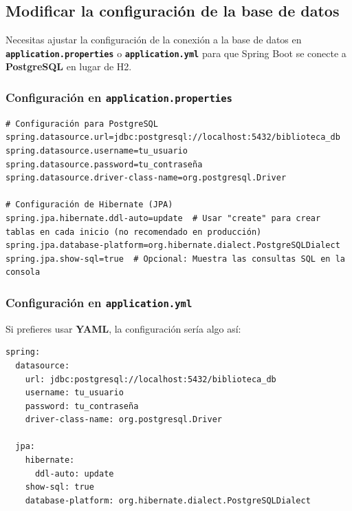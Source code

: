 \documentclass[11pt]{article}
\begin{document}
\subsection{Modificar la configuración de la base de datos}
\label{sec:org623ecda}

Necesitas ajustar la configuración de la conexión a la base de datos en \textbf{\textbf{\texttt{application.properties}}} o \textbf{\textbf{\texttt{application.yml}}} para que Spring Boot se conecte a \textbf{\textbf{PostgreSQL}} en lugar de H2.

\subsubsection{Configuración en \texttt{application.properties}}
\label{sec:org4f34aa8}

\begin{verbatim}
# Configuración para PostgreSQL
spring.datasource.url=jdbc:postgresql://localhost:5432/biblioteca_db
spring.datasource.username=tu_usuario
spring.datasource.password=tu_contraseña
spring.datasource.driver-class-name=org.postgresql.Driver

# Configuración de Hibernate (JPA)
spring.jpa.hibernate.ddl-auto=update  # Usar "create" para crear tablas en cada inicio (no recomendado en producción)
spring.jpa.database-platform=org.hibernate.dialect.PostgreSQLDialect
spring.jpa.show-sql=true  # Opcional: Muestra las consultas SQL en la consola
\end{verbatim}

\subsubsection{Configuración en \texttt{application.yml}}
\label{sec:org0be2d30}

Si prefieres usar \textbf{\textbf{YAML}}, la configuración sería algo así:

\begin{verbatim}
spring:
  datasource:
    url: jdbc:postgresql://localhost:5432/biblioteca_db
    username: tu_usuario
    password: tu_contraseña
    driver-class-name: org.postgresql.Driver

  jpa:
    hibernate:
      ddl-auto: update
    show-sql: true
    database-platform: org.hibernate.dialect.PostgreSQLDialect
\end{verbatim}
\end{document}
